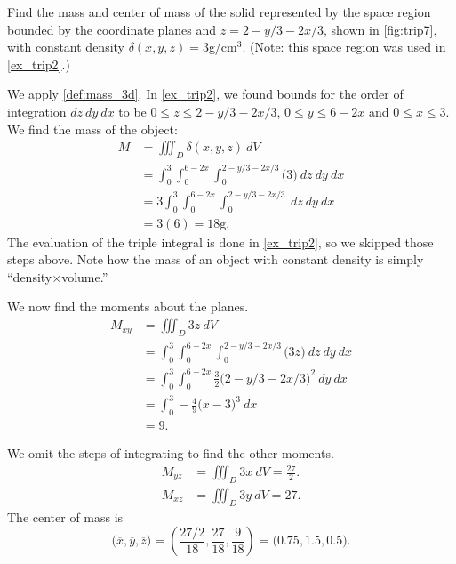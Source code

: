 \begin{example}\label{ex_trip7}
Find the mass and center of mass of the solid represented by the space region bounded by the coordinate planes and $z=2-y/3-2x/3$, shown in \autoref{fig:trip7}, with constant density $\delta(x,y,z)=3$g/cm$^3$. (Note: this space region was used in \autoref{ex_trip2}.)

\solution
We apply \autoref{def:mass_3d}. In \autoref{ex_trip2}, we found bounds for the order of integration $dz\ dy\ dx$ to be $0\leq z\leq 2-y/3-2x/3$, $0\leq y\leq 6-2x$ and $0\leq x\leq 3$. We find the mass of the object: 
\begin{align*}
M &= \iiint_D \delta(x,y,z)\ dV \\
  &= \int_0^3\int_0^{6-2x}\int_0^{2-y/3-2x/3} \big(3\big)\ dz\ dy\ dx\\
	&= 3\int_0^3\int_0^{6-2x}\int_0^{2-y/3-2x/3} \ dz\ dy\ dx\\
	&= 3(6) = 18\text{g}.
\end{align*}
The evaluation of the triple integral is done in \autoref{ex_trip2}, so we skipped those steps above. Note how the mass of an object with constant density is simply ``density$\times$volume.''

We now find the moments about the planes.
\begin{align*}
M_{xy} &= \iiint_D 3z\ dV \\
			&= \int_0^3\int_0^{6-2x}\int_0^{2-y/3-2x/3} \big(3z\big)\ dz\ dy\ dx\\
			&= \int_0^3\int_0^{6-2x} \frac32\big(2-y/3-2x/3\big)^2\ dy\ dx \\
			&= \int_0^3 -\frac49\big(x-3\big)^3\ dx\\
			&= 9.
\end{align*}

We omit the steps of integrating to find the other moments.
\begin{align*}
M_{yz} &= \iiint_D 3x\ dV = \frac{27}2.\\
M_{xz} &= \iiint_D 3y\ dV = 27.
\end{align*}
The center of mass is
\[\big(\overline{x},\overline{y},\overline{z}\big) = \left(\frac{27/2}{18},\frac{27}{18},\frac{9}{18}\right) = \big(0.75,1.5,0.5\big).\]
\end{example}



